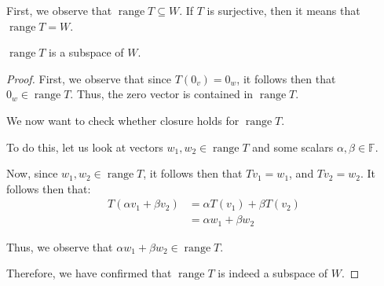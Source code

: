 \documentclass[openany]{book}
\DeclareMathOperator*{\vrange}{range}
\begin{document}
First, we observe that $\vrange T \subseteq W$. If $T$ is surjective, then it means that $\vrange T = W$.

\begin{thm}
	$\vrange T$ is a subspace of $W$.
\end{thm}
\begin{proof}
	First, we observe that since $T(0_{v}) = 0_{w}$, it follows then that $0_{w} \in \vrange T$. Thus, the zero vector is contained in $\vrange T$.
	
	We now want to check whether closure holds for $\vrange T$.
	
	To do this, let us look at vectors $w_{1}, w_{2} \in \vrange T$ and some scalars $\alpha, \beta \in \mathbb{F}$. 
	
	Now, since $w_{1}, w_{2} \in \vrange T$, it follows then that $Tv_{1} = w_{1}$, and $Tv_{2} = w_{2}$. It follows then that:
	\begin{align*}
		T(\alpha v_{1} + \beta v_{2}) &= \alpha T(v_{1}) + \beta T(v_{2}) \\
		&= \alpha w_{1} + \beta w_{2} 
	\end{align*}
	
	Thus, we observe that $\alpha w_{1} + \beta w_{2} \in \vrange T$.
	
	Therefore, we have confirmed that $\vrange T$ is indeed a subspace of $W$.
\end{proof}
\end{document}
